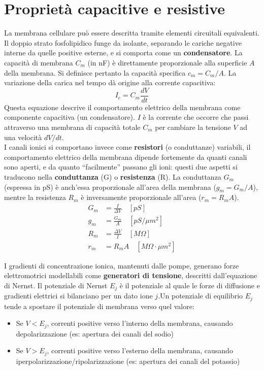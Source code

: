 \section{Proprietà capacitive e resistive}
La membrana cellulare può essere descritta tramite elementi circuitali equivalenti. Il doppio strato fosfolipidico funge da isolante, separando le cariche negative interne da quelle positive esterne, e si comporta come un \textbf{condensatore}. La capacità di membrana $C_m$ (in nF) è direttamente proporzionale alla superficie $A$ della membrana. Si definisce pertanto la capacità specifica $c_m = C_m / A$. La variazione della carica nel tempo dà origine alla corrente capacitiva:
\begin{equation}
I_c = C_m \frac{dV}{dt}
\end{equation}
Questa equazione descrive il comportamento elettrico della membrana come componente capacitiva (un condensatore). $I$ è la corrente che occorre che passi attraverso una membrana di capacità totale $C_m$ per cambiare la tensione $V$ ad una velocità $dV/dt$.\\

\noindent I canali ionici si comportano invece come \textbf{resistori} (o conduttanze) variabili, il comportamento elettrico della membrana dipende fortemente da quanti canali sono aperti, e da quanto “facilmente” passano gli ioni: questi due aspetti si traducono nella \textbf{conduttanza} (G) o \textbf{resistenza} (R). La conduttanza $G_m$ (espressa in pS) è anch'essa proporzionale all'area della membrana ($g_m = G_m / A$), mentre la resistenza $R_m$ è inversamente proporzionale all'area ($r_m = R_m A$).
\begin{equation}
    \begin{split}
            G_m &= \frac{I}{\Delta V} \quad [pS]\\
            g_m &= \frac{G_m}{A} \quad [pS/\mu m^2]\\
            R_m &= \frac{\Delta V}{I} \quad [M\Omega]\\
            r_m &= R_m A \quad [M\Omega \cdot \mu m^2]
    \end{split}
\end{equation}

\noindent I gradienti di concentrazione ionica, mantenuti dalle pompe, generano forze elettromotrici modellabili come \textbf{generatori di tensione}, descritti dall'equazione di Nernst. Il potenziale di Nernst $E_j$ è il potenziale al quale le forze di diffusione e gradienti elettrici si bilanciano per un dato ione $j$.Un potenziale di equilibrio $E_j$ tende a spostare il potenziale di membrana verso quel valore:
\begin{itemize}
    \item Se $V < E_j$, correnti positive verso l'interno della membrana, causando depolarizzazione (es: apertura dei canali del sodio)
    \item Se $V > E_j$, correnti positive verso l'esterno della membrana, causando iperpolarizzazione/ripolarizzazione (es: apertura dei canali del potassio)
\end{itemize}

